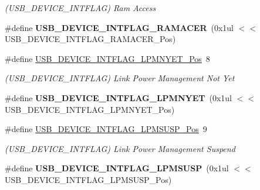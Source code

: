 \begin{DoxyCompactItemize}
\begin{DoxyCompactList}\small\item\em (U\+S\+B\+\_\+\+D\+E\+V\+I\+C\+E\+\_\+\+I\+N\+T\+F\+L\+A\+G) Ram Access \end{DoxyCompactList}\item 
\hypertarget{group___s_a_m_l21___u_s_b_gac05d7784b7ed17f0cbd128c47d58a741}{}\#define {\bfseries U\+S\+B\+\_\+\+D\+E\+V\+I\+C\+E\+\_\+\+I\+N\+T\+F\+L\+A\+G\+\_\+\+R\+A\+M\+A\+C\+E\+R}~(0x1ul $<$$<$ U\+S\+B\+\_\+\+D\+E\+V\+I\+C\+E\+\_\+\+I\+N\+T\+F\+L\+A\+G\+\_\+\+R\+A\+M\+A\+C\+E\+R\+\_\+\+Pos)\label{group___s_a_m_l21___u_s_b_gac05d7784b7ed17f0cbd128c47d58a741}

\item 
\hypertarget{group___s_a_m_l21___u_s_b_ga04b7ff3a63f8e835317dc37860962aea}{}\#define \hyperlink{group___s_a_m_l21___u_s_b_ga04b7ff3a63f8e835317dc37860962aea}{U\+S\+B\+\_\+\+D\+E\+V\+I\+C\+E\+\_\+\+I\+N\+T\+F\+L\+A\+G\+\_\+\+L\+P\+M\+N\+Y\+E\+T\+\_\+\+Pos}~8\label{group___s_a_m_l21___u_s_b_ga04b7ff3a63f8e835317dc37860962aea}

\begin{DoxyCompactList}\small\item\em (U\+S\+B\+\_\+\+D\+E\+V\+I\+C\+E\+\_\+\+I\+N\+T\+F\+L\+A\+G) Link Power Management Not Yet \end{DoxyCompactList}\item 
\hypertarget{group___s_a_m_l21___u_s_b_gaaa40e03137ad1b89da41d834e686b1cc}{}\#define {\bfseries U\+S\+B\+\_\+\+D\+E\+V\+I\+C\+E\+\_\+\+I\+N\+T\+F\+L\+A\+G\+\_\+\+L\+P\+M\+N\+Y\+E\+T}~(0x1ul $<$$<$ U\+S\+B\+\_\+\+D\+E\+V\+I\+C\+E\+\_\+\+I\+N\+T\+F\+L\+A\+G\+\_\+\+L\+P\+M\+N\+Y\+E\+T\+\_\+\+Pos)\label{group___s_a_m_l21___u_s_b_gaaa40e03137ad1b89da41d834e686b1cc}

\item 
\hypertarget{group___s_a_m_l21___u_s_b_ga6398dd5b136f89b835016715bf1ef1d6}{}\#define \hyperlink{group___s_a_m_l21___u_s_b_ga6398dd5b136f89b835016715bf1ef1d6}{U\+S\+B\+\_\+\+D\+E\+V\+I\+C\+E\+\_\+\+I\+N\+T\+F\+L\+A\+G\+\_\+\+L\+P\+M\+S\+U\+S\+P\+\_\+\+Pos}~9\label{group___s_a_m_l21___u_s_b_ga6398dd5b136f89b835016715bf1ef1d6}

\begin{DoxyCompactList}\small\item\em (U\+S\+B\+\_\+\+D\+E\+V\+I\+C\+E\+\_\+\+I\+N\+T\+F\+L\+A\+G) Link Power Management Suspend \end{DoxyCompactList}\item 
\hypertarget{group___s_a_m_l21___u_s_b_ga77fe63ab463bb9bfdaf3e3bddb6a9f7e}{}\#define {\bfseries U\+S\+B\+\_\+\+D\+E\+V\+I\+C\+E\+\_\+\+I\+N\+T\+F\+L\+A\+G\+\_\+\+L\+P\+M\+S\+U\+S\+P}~(0x1ul $<$$<$ U\+S\+B\+\_\+\+D\+E\+V\+I\+C\+E\+\_\+\+I\+N\+T\+F\+L\+A\+G\+\_\+\+L\+P\+M\+S\+U\+S\+P\+\_\+\+Pos)\label{group___s_a_m_l21___u_s_b_ga77fe63ab463bb9bfdaf3e3bddb6a9f7e}


\end{DoxyCompactItemize}

